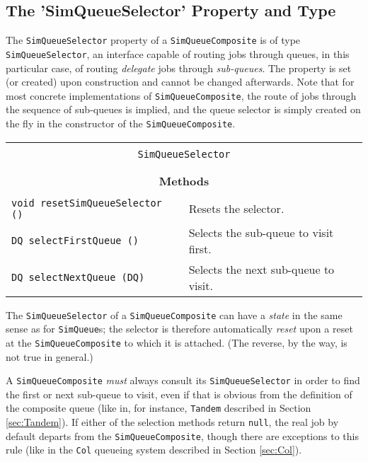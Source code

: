 \subsection{The 'SimQueueSelector' Property and Type}

The \lstinline|SimQueueSelector| property
  of a \lstinline|SimQueueComposite| is of type \lstinline|SimQueueSelector|,
  an interface capable of routing jobs through queues,
  in this particular case,
  of routing {\em delegate\/} jobs through {\em sub-queues}.
The property is set (or created) upon construction and
  cannot be changed afterwards.
Note that
  for most concrete implementations of \lstinline|SimQueueComposite|,
  the route of jobs through the sequence of sub-queues is implied,
  and the queue selector
  is simply created on the fly
  in the constructor of the \lstinline|SimQueueComposite|.
  
\begin{tabular}{|l|l|l|l|}
	\hline
	\multicolumn{4}{|c|}{} \\
	\multicolumn{4}{|c|}{\lstinline[basicstyle=\large]{SimQueueSelector}} \\
	\multicolumn{4}{|c|}{} \\
	\hline
	\multicolumn{4}{|c|}{} \\
	\multicolumn{4}{|c|}{\bf Methods} \\
	\multicolumn{4}{|c|}{} \\
	\hline
	\multicolumn{3}{|l|}{\lstinline|void resetSimQueueSelector ()|} & Resets the selector. \\
	\hline
	\multicolumn{3}{|l|}{\lstinline|DQ selectFirstQueue ()|} & Selects the sub-queue to visit first. \\
	\hline
	\multicolumn{3}{|l|}{\lstinline|DQ selectNextQueue (DQ)|} & Selects the next sub-queue to visit. \\
	\hline
\end{tabular}

The \lstinline|SimQueueSelector| of a \lstinline|SimQueueComposite|
  can have a {\em state\/}
  in the same sense as for \lstinline|SimQueue|s;
  the selector is therefore automatically {\em reset\/}
  upon a reset
  at the \lstinline|SimQueueComposite|
  to which it is attached.
(The reverse, by the way, is not true in general.)

A \lstinline|SimQueueComposite| {\em must\/} always consult
  its \lstinline|SimQueueSelector| in order
  to find the first or next sub-queue to visit,
  even if that is obvious from the definition of the composite queue
  (like in, for instance, \lstinline|Tandem| described in Section \ref{sec:Tandem}).
If either of the selection methods return \lstinline|null|,
  the real job by default departs from the \lstinline|SimQueueComposite|,
  though there are exceptions to this rule
  (like in the \lstinline|Col| queueing system described in Section \ref{sec:Col}).

